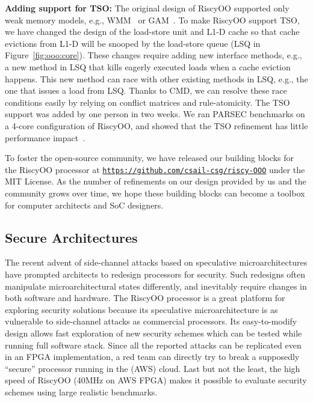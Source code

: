 \documentclass[conference]{IEEEtran}
\begin{document}
\noindent\textbf{Adding support for TSO:}
The original design of RiscyOO supported only weak memory models, e.g., WMM~\cite{wmm} or GAM~\cite{gam}.
To make RiscyOO support TSO, we have changed the design of the load-store unit and L1-D cache so that cache evictions from L1-D will be snooped by the load-store queue (LSQ in Figure~\ref{fig:ooo:core}).
These changes require adding new interface methods, e.g., a new method in LSQ that kills eagerly executed loads when a cache eviction happens.
This new method can race with other existing methods in LSQ, e.g., the one that issues a load from LSQ.
Thanks to CMD, we can resolve these race conditions easily by relying on conflict matrices and rule-atomicity.
The TSO support was added by one person in two weeks.
We ran PARSEC benchmarks on a 4-core configuration of RiscyOO, and showed that the TSO refinement has little performance impact~\cite{riscyoo}.

To foster the open-source community, we have released our building blocks for the RiscyOO processor at \texttt{\url{https://github.com/csail-csg/riscy-OOO}} under the MIT License.
As the number of refinements on our design provided by us and the community grows over time, we hope these building blocks can become a toolbox for computer architects and SoC designers.

\subsection{Secure Architectures}
The recent advent of side-channel attacks based on speculative microarchitectures have prompted architects to redesign processors for security.
Such redesigns often manipulate microarchitectural states differently, and inevitably require changes in both software and hardware.
The RiscyOO processor is a great platform for exploring security solutions because its speculative microarchitecture is as vulnerable to side-channel attacks as commercial processors.
Its easy-to-modify design allows fast exploration of new security schemes which can be tested while running full software stack.
Since all the reported attacks can be replicated even in an FPGA implementation, a red team can directly try to break a supposedly ``secure'' processor running in the (AWS) cloud.
Last but not the least, the high speed of RiscyOO (40MHz on AWS FPGA) makes it possible to evaluate security schemes using large realistic benchmarks.
\end{document}
